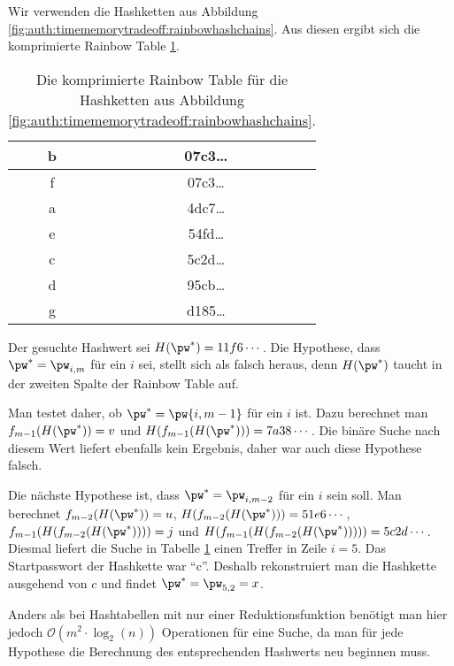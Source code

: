\begin{beispiel}
	Wir verwenden die Hashketten aus Abbildung \ref{fig:auth:timememorytradeoff:rainbowhashchains}. Aus diesen ergibt sich die komprimierte Rainbow Table \ref{table:auth:rainbowtable}.
	
\begin{table}[h]
	\begin{center}
		\begin{tabular}{|c|c|}
			\hline
			b & 07c3\ldots\\\hline
			f & 07c3\ldots\\\hline
			a & 4dc7\ldots\\\hline
			e & 54fd\ldots\\\hline
			c & 5c2d\ldots\\\hline
			d & 95cb\ldots\\\hline
			g & d185\ldots\\\hline
		\end{tabular}
	\end{center}
	\caption{Die komprimierte Rainbow Table für die Hashketten aus Abbildung \ref{fig:auth:timememorytradeoff:rainbowhashchains}.}
	\label{table:auth:rainbowtable}
\end{table}

	Der gesuchte Hashwert sei $H(\pw^*) = 11f6\cdots$.
	Die Hypothese, dass $\pw^* = \pw_{i,m}$ für ein $i$ sei, stellt sich als falsch heraus, denn $H(\pw^*)$ taucht in der zweiten Spalte der Rainbow Table auf.
	
	Man testet daher, ob $\pw^* = \pw{i,m-1}$ für ein $i$ ist. Dazu berechnet man $f_{m-1}(H(\pw^*)) = v$ und $H(f_{m-1}(H(\pw^*))) = 7a38\cdots$. Die binäre Suche nach diesem Wert liefert ebenfalls kein Ergebnis, daher war auch diese Hypothese falsch.
	
	Die nächste Hypothese ist, dass $\pw^* = \pw_{i,m-2}$ für ein $i$ sein soll.
	Man berechnet $f_{m-2}(H(\pw^*)) = u$, $H(f_{m-2}(H(\pw^*))) = 51e6\cdots$, $f_{m-1}(H(f_{m-2}(H(\pw^*)))) = j$ und $H(f_{m-1}(H(f_{m-2}(H(\pw^*))))) = 5c2d\cdots$. Diesmal liefert die Suche in Tabelle \ref{table:auth:rainbowtable} einen Treffer in Zeile $i = 5$. Das Startpasswort der Hashkette war "`c"'. Deshalb rekonstruiert man die Hashkette ausgehend von $c$ und findet $\pw^* = \pw_{5,2} = x$.\\
\end{beispiel}

Anders als bei Hashtabellen mit nur einer Reduktionsfunktion benötigt man hier jedoch $\mathcal{O}(m^2 \cdot \log_2(n))$ Operationen für eine Suche, da man für jede Hypothese die Berechnung des entsprechenden Hashwerts neu beginnen muss.

